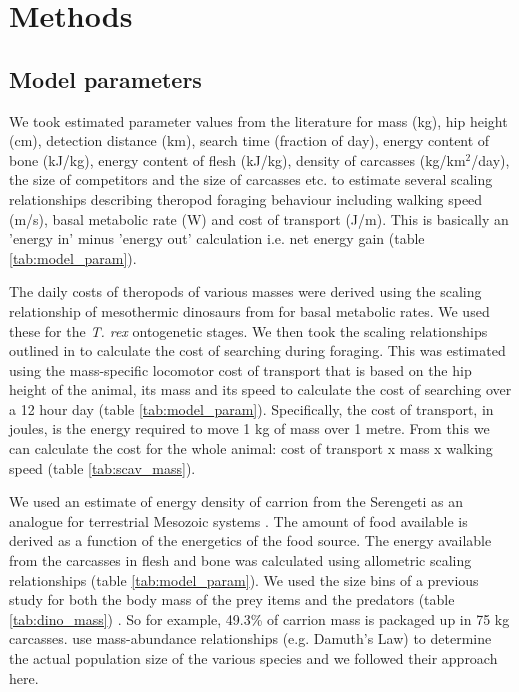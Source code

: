 \section{\uppercase{M}ethods}
\subsection{Model parameters}


We took estimated parameter values from the literature for mass (kg), hip height (cm), detection distance (km), search time (fraction of day), energy content of bone (kJ/kg), energy content of flesh (kJ/kg), density of carcasses (kg/km$^2$/day), the size of competitors and the size of carcasses etc. to estimate several scaling relationships describing theropod foraging behaviour including walking speed (m/s), basal metabolic rate (W) and cost of transport (J/m). This is basically an 'energy in' minus 'energy out' calculation i.e. net energy gain (table \ref{tab:model_param}). 


\begin{table}[H]
\small %
		\caption[Model Parameters] %
				{Model parameters and their values for \textit{T.rex} foraging models.  
} 
		
		\label{tab:model_param}
	\end{table}


The daily costs of theropods of various masses were derived using the scaling relationship of mesothermic dinosaurs from \cite{grady2014evidence} for basal metabolic rates. We used these for the \textit{T. rex} ontogenetic stages. We then took the scaling relationships outlined in \cite{pontzer2009biomechanics} to calculate the cost of searching during foraging. This was estimated using the mass-specific locomotor cost of transport that is based on the hip height of the animal, its mass and its speed to calculate the cost of searching over a 12 hour day (table \ref{tab:model_param}). Specifically, the cost of transport, in joules, is the energy required to move 1 kg of mass over 1 metre. From this we can calculate the cost for the whole animal: cost of transport x mass x walking speed (table \ref{tab:scav_mass}). 

We used an estimate of energy density of carrion from the Serengeti as an analogue for terrestrial Mesozoic systems \citep{ruxton2003could,carbone2011intra}. The amount of food available is derived as a function of the energetics of the food source. The energy available from the carcasses in flesh and bone was calculated using allometric scaling relationships (table \ref{tab:model_param}). We used the size bins of a previous study for both the body mass of the prey items and the predators (table \ref{tab:dino_mass}) \citep{carbone2011intra}. So for example, 49.3\% of carrion mass is packaged up in 75 kg carcasses. \cite{carbone2011intra} use mass-abundance relationships (e.g. Damuth's Law) to determine the actual population size of the various species and we followed their approach here. 

